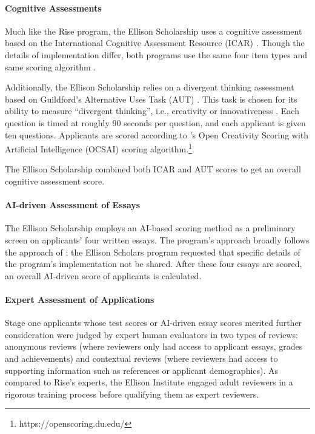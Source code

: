 \paragraph{Cognitive Assessments} 
Much like the Rise program, the Ellison Scholarship uses a cognitive assessment based on the International Cognitive Assessment Resource (ICAR) \cite{condon2014international,subotic2020psychometric}. Though the details of implementation differ, both programs use the same four item types and same scoring algorithm \cite{burkner2021bayesian}.

Additionally, the Ellison Scholarship relies on a divergent thinking assessment based on Guildford's Alternative Uses Task (AUT) \cite{guilford1967creativity}. This task is chosen for its ability to measure ``divergent thinking'', i.e., creativity or innovativeness \cite{dumas_measuring_2020,organisciak_beyond_2023}. Each question is timed at roughly 90 seconds per question, and each applicant is given ten questions. Applicants are scored according to \textcite{organisciak_beyond_2023}'s Open Creativity Scoring with Artificial Intelligence (OCSAI) scoring algorithm.\footnote{https://openscoring.du.edu/}

The Ellison Scholarship combined both ICAR and AUT scores to get an overall cognitive assessment score.

\paragraph{AI-driven Assessment of Essays}
The Ellison Scholarship employs an AI-based scoring method as a preliminary screen on applicants' four written essays. The program's approach broadly follows the approach of \textcite{xiao2024humanaicollaborativeessayscoring}; the Ellison Scholars program requested that specific details of the program's implementation not be shared. After these four essays are scored, an overall AI-driven score of applicants is calculated.

\paragraph{Expert Assessment of Applications}
Stage one applicants whose test scores or AI-driven essay scores merited further consideration were judged by expert human evaluators in two types of reviews: anonymous reviews (where reviewers only had access to applicant essays, grades and achievements) and contextual reviews (where reviewers had access to supporting information such as references or applicant demographics). As compared to Rise's experts, the Ellison Institute engaged adult reviewers in a rigorous training process before qualifying them as expert reviewers.

